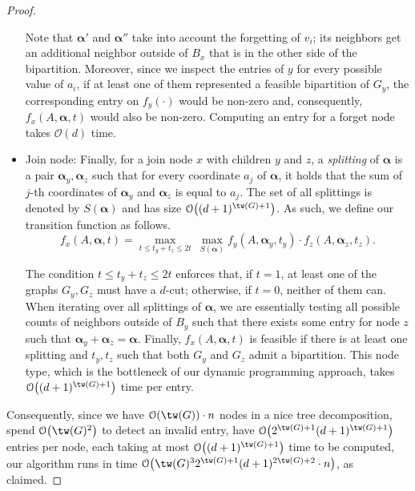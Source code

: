\documentclass[a4paper,UKenglish,cleveref, autoref]{lipics-v2019}
\newcommand{\balpha}{\boldsymbol{\alpha}}
\newcommand{\bigO}[1]{\mathcal{O}\!\left(#1\right)}
\newcommand{\tdef}[1]{\emph{#1}}
\begin{document}
\begin{proof}
\begin{itemize}
        Note that $\balpha'$ and $\balpha''$ take into account the forgetting of $v_i$; its neighbors get an additional neighbor outside of $B_x$ that is in the other side of the bipartition.
        Moreover, since we inspect the entries of $y$ for every possible value of $a_i$, if at least one of them represented a feasible bipartition of $G_y$, the corresponding entry on $f_y(\cdot)$ would be non-zero and, consequently, $f_x(A, \balpha, t)$ would also be non-zero.
        Computing an entry for a forget node takes $\bigO{d}$ time.

        \item Join node: Finally, for a join node $x$ with children $y$ and $z$, a \tdef{splitting} of $\balpha$ is a pair $\balpha_y, \balpha_z$ such that for every coordinate $a_j$ of $\balpha$, it holds that the sum of $j$-th coordinates of $\balpha_y$ and $\balpha_z$ is equal to $a_j$. The set of all splittings is denoted by $S(\balpha)$ and has size $\bigO{(d+1)^{\tw(G)+1}}$.
        As such, we define our transition function as follows.
        \begin{equation*}
            f_x(A, \balpha, t) = \max_{t \leq t_y + t_z \leq 2t}\ \max_{S(\balpha)} f_y(A, \balpha_y, t_y) \cdot f_z(A, \balpha_z, t_z).
        \end{equation*}

        The condition $t \leq t_y + t_z \leq 2t$ enforces that, if $t = 1$, at least one of the graphs $G_y, G_z$ must have a $d$-cut; otherwise, if $t = 0$, neither of them can.
        When iterating over all splittings of $\balpha$, we are essentially testing all possible counts of neighbors outside of $B_y$ such that there exists some entry for node $z$ such that $\balpha_y + \balpha_z = \balpha$.
        Finally, $f_x(A, \balpha, t)$ is feasible if there is at least one splitting and $t_y, t_z$ such that both $G_y$ and $G_z$ admit a bipartition.
        This node type, which is the bottleneck of our dynamic programming approach, takes $\bigO{(d+1)^{\tw(G)+1}}$ time per entry.
    \end{itemize}

    Consequently, since we have $\bigO{\tw(G)} \cdot n$ nodes in a nice tree decomposition, spend $\bigO{\tw(G)^2}$ to detect an invalid entry, have $\bigO{2^{\tw(G) +1}(d+1)^{\tw(G)+1}}$ entries per node, each taking at most $\bigO{(d+1)^{\tw(G)+1}}$ time to be computed, our algorithm runs in time $\bigO{\tw(G)^32^{\tw(G)+1}(d+1)^{2\tw(G)+2}\cdot n}$, as claimed.
\end{proof}
\end{document}
